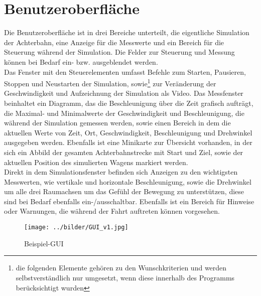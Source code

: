 
\chapter{Benutzeroberfläche}

Die Benutzeroberfläche ist in drei Bereiche unterteilt, die eigentliche Simulation der Achterbahn, eine Anzeige für die Messwerte und ein Bereich für die Steuerung während der Simulation. Die Felder zur Steuerung und Messung können bei Bedarf ein- bzw. ausgeblendet werden.\\
Das Fenster mit den Steuerelementen umfasst Befehle zum Starten, Pausieren, Stoppen und Neustarten der Simulation, sowie\footnote{die folgenden Elemente gehören zu den Wunschkriterien und werden selbstverständlich nur umgesetzt, wenn diese innerhalb des Programms berücksichtigt wurden} zur Veränderung der Geschwindigkeit und Aufzeichnung der Simulation als Video.
Das Messfenster beinhaltet ein Diagramm, das die Beschleunigung über die Zeit grafisch aufträgt, die Maximal- und Minimalwerte der Geschwindigkeit und Beschleunigung, die während der Simulation gemessen werden, sowie einen Bereich in dem die aktuellen Werte von Zeit, Ort, Geschwindigkeit, Beschleunigung und Drehwinkel ausgegeben werden.
Ebenfalls ist eine Minikarte zur Übersicht vorhanden, in der sich ein Abbild der gesamten Achterbahnstrecke mit Start und Ziel, sowie der aktuellen Position des simulierten Wagens markiert werden.\\
Direkt in dem Simulationsfenster befinden sich Anzeigen zu den wichtigsten Messwerten, wie vertikale und horizontale Beschleunigung, sowie die Drehwinkel um alle drei Raumachsen um das Gefühl der Bewegung zu unterstützen, diese sind bei Bedarf ebenfalls ein-/ausschaltbar. Ebenfalls ist ein Bereich für Hinweise oder Warnungen, die während der Fahrt auftreten können vorgesehen. 
\begin{figure}[!h]%
\texttt{[image: ../bilder/GUI\_v1.jpg]}%
\caption{Beispiel-GUI}%
\label{}%
\end{figure}